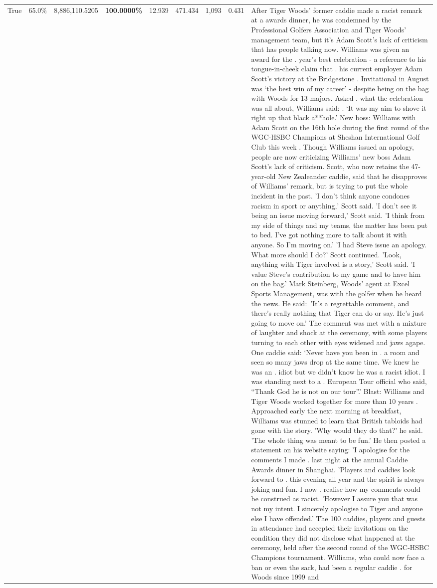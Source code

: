 \begin{table}[H]
\begin{tabular}{lllrlllll}
True & 65.0\% & 8,886,110.5205 & \bfseries \color{red} 100.0000\% & 12.939 & 471.434 & 1,093 & 0.431 & After Tiger Woods' former caddie made a racist remark at a awards dinner, he was condemned by the Professional Golfers Association and Tiger Woods' management team, but it's Adam Scott's lack of criticism that has people talking now. Williams was given an award for the . year’s best celebration - a reference to his tongue-in-cheek claim that . his current employer Adam Scott’s victory at the Bridgestone . Invitational in August was ‘the best win of my career’ - despite being on the bag with Woods for 13 majors. Asked . what the celebration was all about, Williams said: . ‘It was my aim to shove it right up that black a**hole.’ New boss: Williams with Adam Scott  on the 16th hole during the first round of the WGC-HSBC Champions at Sheshan International Golf Club this week . Though Williams issued an apology, people are now criticizing Williams' new boss Adam Scott's lack of criticism. Scott, who now retains the 47-year-old New Zealeander caddie, said that he disapproves of Williams' remark, but is trying to put the whole incident in the past. 'I don't think anyone condones racism in sport or anything,' Scott said. 'I don't see it being an issue moving forward,' Scott said. 'I think from my side of things and my teams, the matter has been put to bed. I've got nothing more to talk about it with anyone. So I'm moving on.' 'I had Steve issue an apology. What more should I do?' Scott continued. 'Look, anything with Tiger involved is a story,' Scott said. 'I value Steve's contribution to my game and to have him on the bag.' Mark Steinberg, Woods' agent at Excel Sports Management, was with the golfer when he heard the news. He said: 'It's a regrettable comment, and there's really nothing that Tiger can do or say. He's just going to move on.' The comment was met with a mixture of laughter and shock at the ceremony, with some players turning to each other with eyes widened and jaws agape. One caddie said: ‘Never have you been in . a room and seen so many jaws drop at the same time. We knew he was an . idiot but we didn’t know he was a racist idiot. I was standing next to a . European Tour official who said, “Thank God he is not on our tour”.’ Blast: Williams and Tiger Woods worked together for more than 10 years . Approached early the next morning at breakfast, Williams was stunned to learn that British tabloids had gone with the story. 'Why would they do that?' he said. 'The whole thing was meant to be fun.' He then posted a statement on his website saying: 'I apologise for the comments I made . last night at the annual Caddie Awards dinner in Shanghai. 'Players and caddies look forward to . this evening all year and the spirit is always joking and fun. I now . realise how my comments could be construed as racist. 'However I assure you that was not my intent. I sincerely apologise to Tiger and anyone else I have offended.' The 100 caddies, players and guests in attendance had accepted their invitations on the condition they did not disclose what happened at the ceremony, held after the second round of the WGC-HSBC Champions tournament. Williams, who could now face a ban or even the sack, had been a regular caddie . for Woods since 1999 and 
\end{tabular}
\end{table}
